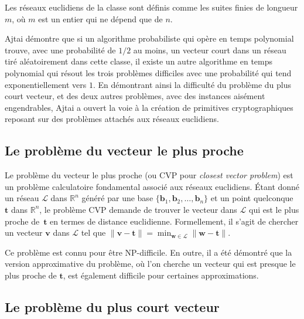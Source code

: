 Les réseaux euclidiens de la classe sont définis comme les suites finies de longueur $m$, où $m$ est un entier qui ne dépend que de $n$.

Ajtai démontre que si un algorithme probabiliste qui opère en temps polynomial trouve, avec une
probabilité de $1/2$ au moins, un vecteur court dans un réseau tiré aléatoirement dans cette classe,
il existe un autre algorithme en temps polynomial qui résout les trois problèmes difficiles avec une
probabilité qui tend exponentiellement vers $1$.
En démontrant ainsi la difficulté du problème du plus court vecteur, et des deux autres problèmes, avec des instances aisément
engendrables, Ajtai a ouvert la voie à la création de primitives cryptographiques reposant sur des
problèmes attachés aux réseaux euclidiens.





\subsection{Le problème du vecteur le plus proche} 
Le problème du vecteur le plus proche (ou CVP pour \emph{closest vector problem}) est un problème calculatoire fondamental associé aux réseaux euclidiens. Étant donné un réseau $\mathcal{L}$ dans $\mathbb{R}^n$ généré par une base $\{\mathbf{b}_1, \mathbf{b}_2, \ldots, \mathbf{b}_n\}$ et un point quelconque~$\mathbf{t}$ dans $\mathbb{R}^n$, le problème CVP demande de trouver le vecteur dans $\mathcal{L}$ qui est le plus proche de~$\mathbf{t}$ en termes de distance euclidienne.
Formellement, il s’agit de chercher un vecteur $\mathbf{v}$ dans $\mathcal{L}$ tel que $\|\mathbf{v}-\mathbf{t}\| = \min_{\mathbf{w} \in \mathcal{L}} \|\mathbf{w}-\mathbf{t}\|$.

Ce problème est connu pour être NP-difficile. En outre, il a été démontré que la version approximative du problème, où l'on cherche un vecteur qui est presque le plus proche de $\mathbf{t}$, est également difficile pour certaines approximations. 

\subsection{Le problème du plus court vecteur}

